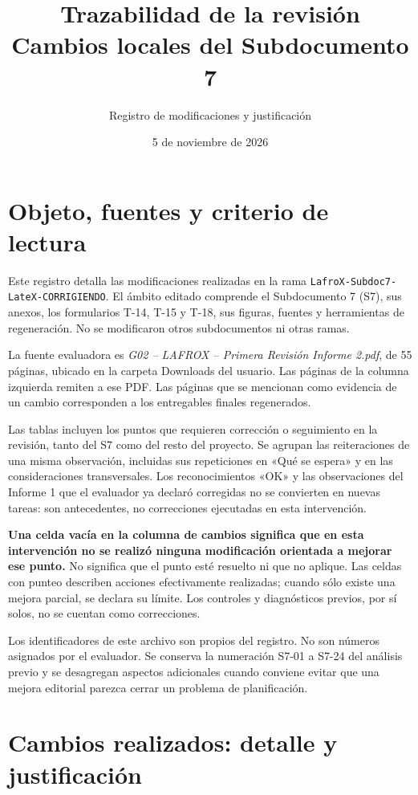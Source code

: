 \documentclass[11pt,letterpaper]{article}
\title{\textcolor{naranja}{Trazabilidad de la revisión}\\Cambios locales del Subdocumento 7}
\author{Registro de modificaciones y justificación}
\date{5 de noviembre de 2026}
\newcommand{\ruta}[1]{\nolinkurl{#1}}
\begin{document}
\maketitle
\tableofcontents
\newpage

\section{Objeto, fuentes y criterio de lectura}

Este registro detalla las modificaciones realizadas en la rama
\ruta{LafroX-Subdoc7-LateX-CORRIGIENDO}. El ámbito editado comprende el
Subdocumento 7 (S7), sus anexos, los formularios T-14, T-15 y T-18, sus figuras,
fuentes y herramientas de regeneración. No se modificaron otros subdocumentos
ni otras ramas.

La fuente evaluadora es \emph{G02 -- LAFROX -- Primera Revisión Informe 2.pdf},
de 55 páginas, ubicado en la carpeta Downloads del usuario. Las páginas de la
columna izquierda remiten a ese PDF. Las páginas que se mencionan como evidencia
de un cambio corresponden a los entregables finales regenerados.

Las tablas incluyen los puntos que requieren corrección o seguimiento en la
revisión, tanto del S7 como del resto del proyecto. Se agrupan las reiteraciones
de una misma observación, incluidas sus repeticiones en «Qué se espera» y en las
consideraciones transversales. Los reconocimientos «OK» y las observaciones del
Informe 1 que el evaluador ya declaró corregidas no se convierten en nuevas
tareas: son antecedentes, no correcciones ejecutadas en esta intervención.

\textbf{Una celda vacía en la columna de cambios significa que en esta
intervención no se realizó ninguna modificación orientada a mejorar ese punto.}
No significa que el punto esté resuelto ni que no aplique. Las celdas con punteo
describen acciones efectivamente realizadas; cuando sólo existe una mejora
parcial, se declara su límite. Los controles y diagnósticos previos, por sí solos,
no se cuentan como correcciones.

Los identificadores de este archivo son propios del registro. No son números
asignados por el evaluador. Se conserva la numeración S7-01 a S7-24 del análisis
previo y se desagregan aspectos adicionales cuando conviene evitar que una mejora
editorial parezca cerrar un problema de planificación.

\section{Cambios realizados: detalle y justificación}
\end{document}
